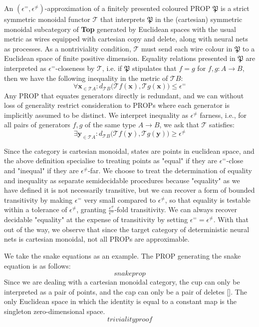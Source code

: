 \begin{fullwidth}
\begin{defn}
An $(\epsilon^{=},\epsilon^{\neq})$-approximation of a finitely presented coloured PROP $\mathfrak{P}$ is a strict symmetric monoidal functor $\mathcal{T}$ that interprets $\mathfrak{P}$ in the (cartesian) symmetric monoidal subcategory of \textbf{Top} generated by Euclidean spaces with the usual metric as wires equipped with cartesian copy and delete, along with neural nets as processes. As a nontriviality condition, $\mathcal{T}$ must send each wire colour in $\mathfrak{P}$ to a Euclidean space of finite positive dimension. Equality relations presented in $\mathfrak{P}$ are interpreted as $\epsilon^{=}$-closeness by $\mathcal{T}$, i.e. if $\mathfrak{P}$ stipulates that $f = g$ for $f,g: A \rightarrow B$, then we have the following inequality in the metric of $\mathcal{T}B$:
\[\forall \mathbf{x}_{\in\mathcal{T}A} : d_{\mathcal{T}B}\big(\mathcal{T}f(\mathbf{x}),\mathcal{T}g(\mathbf{x})\big) \leq \epsilon^{=}\]
Any PROP that equates generators directly is redundant, and we can without loss of generality restrict consideration to PROPs where each generator is implicitly assumed to be distinct. We interpret inequality as $\epsilon^{\neq}$ farness, i.e., for all pairs of generators $f,g$ of the same type $A \rightarrow B$, we ask that $\mathcal{T}$ satisfies:
\[\exists \mathbf{y}_{\in\mathcal{T}A} : d_{\mathcal{T}B}\big(\mathcal{T}f(\mathbf{y}),\mathcal{T}g(\mathbf{y})\big) \geq \epsilon^{\neq} \]
\end{defn}

Since the category is cartesian monoidal, states are points in euclidean space, and the above definition specialise to treating points as "equal" if they are $\epsilon^{=}$-close and "inequal" if they are $\epsilon^{\neq}$-far. We choose to treat the determination of equality and inequality as separate semidecidable procedures because "equality" as we have defined it is not necessarily transitive, but we can recover a form of bounded transitivity by making $\epsilon^{=}$ very small compared to $\epsilon^{\neq}$, so that equality is testable within a tolerance of $\epsilon^{\neq}$, granting $\frac{\epsilon^{\neq}}{\epsilon^{=}}$-fold transitivity. We can always recover decidable "equality" at the expense of transitivity by setting $\epsilon^{=} = \epsilon^{\neq}$. With that out of the way, we observe that since the target category of deterministic neural nets is cartesian monoidal, not all PROPs are approximable.

\begin{example}
We take the snake equations as an example. The PROP generating the snake equation is as follows:
\[snakeprop\]
Since we are dealing with a cartesian monoidal category, the cup can only be interpreted as a pair of points, and the cap can only be a pair of deletes []. The only Euclidean space in which the identity is equal to a constant map is the singleton zero-dimensional space.
\[triviality proof\]
\end{example}


\end{fullwidth}
